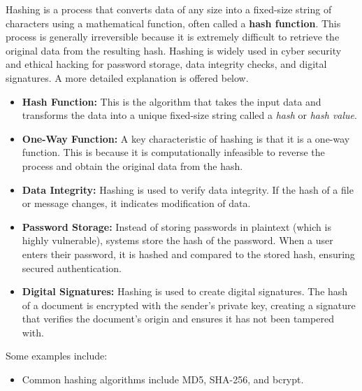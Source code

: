  Hashing is a process that converts data of any size into a fixed-size string of characters using a mathematical function, often called a \textbf{ hash function}. This process is generally irreversible because it is extremely difficult to retrieve the original data from the resulting hash. Hashing is widely used in cyber security and ethical hacking for password storage, data integrity checks, and digital signatures. A more detailed explanation is offered below.
\begin{itemize}
    \item \textbf{Hash Function:} This is the algorithm that takes the input data and transforms the data into a unique fixed-size string called a \textit{hash} or \textit{hash value}.
    \item \textbf{One-Way Function:} A key characteristic of hashing is that it is a one-way function. This is because it is computationally infeasible to reverse the process and obtain the original data from the hash.
    \item \textbf{Data Integrity:} Hashing is used to verify data integrity. If the hash of a file or message changes, it indicates modification of data.
    \item \textbf{Password Storage:} Instead of storing passwords in plaintext (which is highly vulnerable), systems store the hash of the password. When a user enters their password, it is hashed and compared to the stored hash, ensuring secured authentication.
    \item \textbf{Digital Signatures:} Hashing is used to create digital signatures. The hash of a document is encrypted with the sender's private key, creating a signature that verifies the document's origin and ensures it has not been tampered with.
\end{itemize}
Some examples include:
\begin{itemize}
    \item Common hashing algorithms include MD5, SHA-256, and bcrypt.
\end{itemize}

